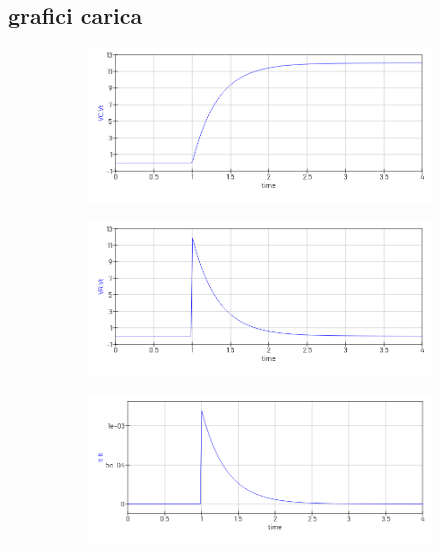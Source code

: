 \documentclass[12pt]{article}
\begin{document}
\subsection*{grafici carica}
\begin{figure}[h!]
  \centering
  \begin{subfigure}[b]{0.3\linewidth}
    \includegraphics[width=\linewidth]{data/carica-VC.png}
  \end{subfigure}
  \begin{subfigure}[b]{0.3\linewidth}
    \includegraphics[width=\linewidth]{data/carica-VR.png}
  \end{subfigure}
  \begin{subfigure}[b]{0.3\linewidth}
    \includegraphics[width=\linewidth]{data/carica-IT.png}
  \end{subfigure}
\end{figure}
\end{document}
